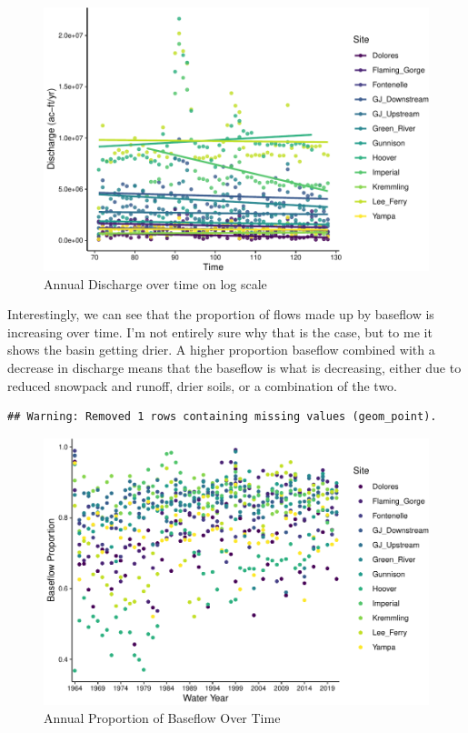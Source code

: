 \documentclass[
  12pt,
]{article}
\begin{document}
\begin{figure}

\includegraphics{WDA_final_project_files/figure-latex/Annual Discharge Trends-1} \hfill{}

\caption{Annual Discharge over time on log scale}\label{fig:Annual Discharge Trends}
\end{figure}

Interestingly, we can see that the proportion of flows made up by
baseflow is increasing over time. I'm not entirely sure why that is the
case, but to me it shows the basin getting drier. A higher proportion
baseflow combined with a decrease in discharge means that the baseflow
is what is decreasing, either due to reduced snowpack and runoff, drier
soils, or a combination of the two.

\begin{verbatim}
## Warning: Removed 1 rows containing missing values (geom_point).
\end{verbatim}

\begin{figure}

\includegraphics{WDA_final_project_files/figure-latex/Proportion of Baseflow-1} \hfill{}

\caption{Annual Proportion of Baseflow Over Time}\label{fig:Proportion of Baseflow}
\end{figure}
\end{document}
